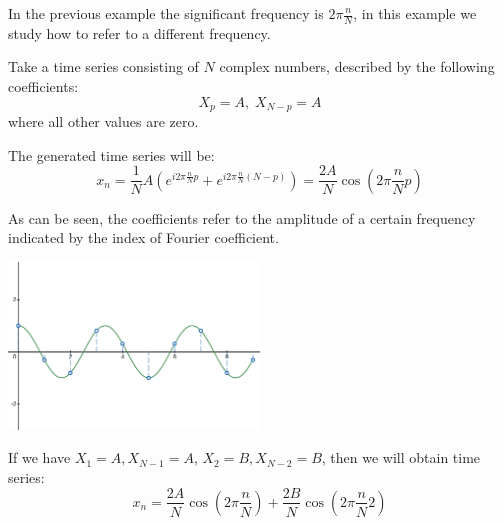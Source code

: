 \begin{exempli_gratia}[Frequency]
	\begin{toReview}
		In the previous example the significant frequency is $2\pi\frac{n}{N}$, in this example we study how to refer to a different frequency.
	\end{toReview}

	\noindent Take a time series consisting of $N$ complex numbers, described by the following coefficients:
	\[
		X_p=A,\;X_{N-p}=A
	\]
	where all other values are zero.

	\noindent The generated time series will be:
    \[
		x_n = \frac{1}{N}A\left(e^{i2\pi \frac{n}{N}p} + e^{i2\pi \frac{n}{N}(N-p)}\right) = \frac{2A}{N}\cos\left(2\pi\frac{n}{N}p\right)
	\]
	\begin{modified}
	As can be seen, the coefficients refer to the amplitude of a certain frequency indicated by the index of Fourier coefficient.
	\begin{center}
		\centering
		\includegraphics[width=0.5\textwidth]{Figures/fftexample2.png}
	\end{center}

	\noindent If we have $X_1=A, X_{N-1}=A$, $X_2=B, X_{N-2}=B$, then we will obtain time series:
	\[
		x_n = \frac{2A}{N}\cos\left(2\pi\frac{n}{N}\right) + \frac{2B}{N}\cos\left(2\pi\frac{n}{N}2\right)
	\]
	\end{modified}
\end{exempli_gratia}
